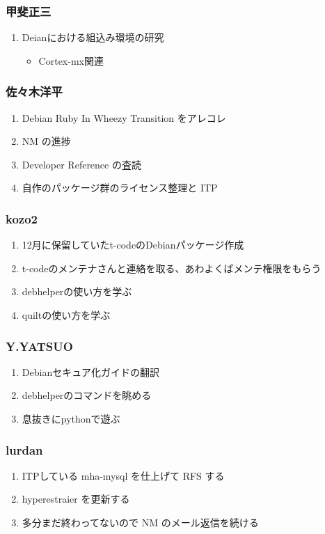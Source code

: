 \documentclass[cjk,dvipdfmx,10pt,%
hyperref={bookmarks=true,bookmarksnumbered=true,bookmarksopen=false,%
colorlinks=false,%
pdftitle={第 55 回 関西 Debian 勉強会＠Debian 温泉合宿},%
pdfauthor={倉敷・のがた・佐々木・かわだ},%
pdfsubject={資料},%
}]{beamer}
\begin{document}
\begin{frame}[fragile]
  \frametitle{ 甲斐正三 }
  \begin{enumerate}
  \item Deianにおける組込み環境の研究
    \begin{itemize}
    \item Cortex-mx関連
    \end{itemize}
  \end{enumerate}
\end{frame}

\begin{frame}[fragile]
  \frametitle{ 佐々木洋平 }
  \begin{enumerate}
  \item Debian Ruby In Wheezy Transition をアレコレ
  \item NM の進捗
  \item Developer Reference の査読
  \item 自作のパッケージ群のライセンス整理と ITP
  \end{enumerate}
\end{frame}

\begin{frame}[fragile]
  \frametitle{ kozo2 }
  \begin{enumerate}
  \item 12月に保留していたt-codeのDebianパッケージ作成
  \item t-codeのメンテナさんと連絡を取る、あわよくばメンテ権限をもらう
  \item debhelperの使い方を学ぶ
  \item quiltの使い方を学ぶ
  \end{enumerate}
\end{frame}

\begin{frame}[fragile]
  \frametitle{ Y.YATSUO }
  \begin{enumerate}
  \item Debianセキュア化ガイドの翻訳
  \item debhelperのコマンドを眺める
  \item 息抜きにpythonで遊ぶ
  \end{enumerate}
\end{frame}

\begin{frame}[fragile]
  \frametitle{ lurdan }
  \begin{enumerate}
  \item ITPしている mha-mysql を仕上げて RFS する
  \item hyperestraier を更新する
  \item 多分まだ終わってないので NM のメール返信を続ける
  \end{enumerate}
\end{frame}
\end{document}
